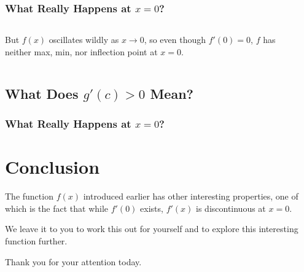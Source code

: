 \documentclass{beamer}
\theoremstyle{definition}
\begin{document}
\begin{frame}
\frametitle{What Really Happens at $x=0$?}
\begin{columns} 
\begin{column}{0.5\textwidth}
But $f(x)$ oscillates wildly as $x\to 0$, so even though $f'(0)=0$, $f$ has 
neither max, min, nor inflection point at $x=0$.
\end{column}
\pause
\begin{column}{0.5\textwidth}
\end{column}
\end{columns}
\end{frame}

\subsection{What Does $g'(c)>0$ Mean?} 
\begin{frame}
\frametitle{What Really Happens at $x=0$?}

\begin{center}
\end{center}

\end{frame}

\section{Conclusion}

{
\begin{frame}
The function $f(x)$ introduced earlier has other interesting properties, 
one of which is the fact that while $f'(0)$ exists, $f'(x)$ is 
discontinuous at $x=0$.
\vspace{.5cm}

We leave it to you to work this out for yourself and to explore this 
interesting function further.
\vspace{.5cm}

Thank you for your attention today.
\end{frame}
}
\end{document}
